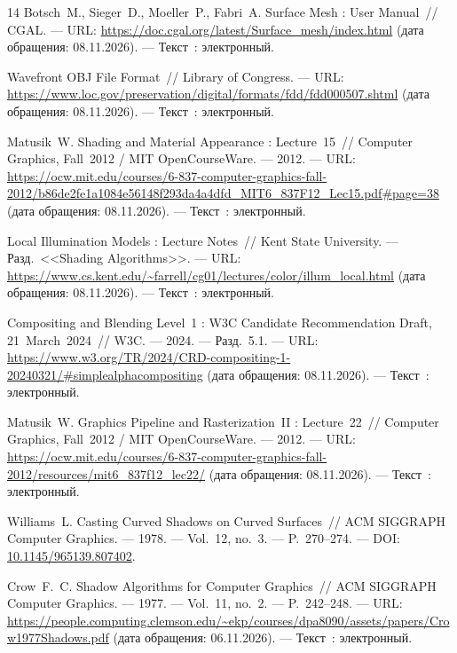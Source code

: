 \begin{thebibliography}{14}
Botsch~M., Sieger~D., Moeller~P., Fabri~A. Surface Mesh : User Manual~// CGAL. --- URL: \url{https://doc.cgal.org/latest/Surface_mesh/index.html} (дата обращения: 08.11.2026). --- Текст~: электронный.

Wavefront OBJ File Format~// Library of Congress. --- URL: \url{https://www.loc.gov/preservation/digital/formats/fdd/fdd000507.shtml} (дата обращения: 08.11.2026). --- Текст~: электронный.

Matusik~W. Shading and Material Appearance : Lecture~15~// Computer Graphics, Fall~2012 / MIT OpenCourseWare. --- 2012. --- URL: \url{https://ocw.mit.edu/courses/6-837-computer-graphics-fall-2012/b86de2fe1a1084e56148f293da4a4dfd_MIT6_837F12_Lec15.pdf#page=38} (дата обращения: 08.11.2026). --- Текст~: электронный.

Local Illumination Models : Lecture Notes~// Kent State University. --- Разд.~<<Shading Algorithms>>. --- URL: \url{https://www.cs.kent.edu/~farrell/cg01/lectures/color/illum_local.html} (дата обращения: 08.11.2026). --- Текст~: электронный.

Compositing and Blending Level~1 : W3C Candidate Recommendation Draft, 21~March~2024~// W3C. --- 2024. --- Разд.~5.1. --- URL: \url{https://www.w3.org/TR/2024/CRD-compositing-1-20240321/#simplealphacompositing} (дата обращения: 08.11.2026). --- Текст~: электронный.

Matusik~W. Graphics Pipeline and Rasterization~II : Lecture~22~// Computer Graphics, Fall~2012 / MIT OpenCourseWare. --- 2012. --- URL: \url{https://ocw.mit.edu/courses/6-837-computer-graphics-fall-2012/resources/mit6_837f12_lec22/} (дата обращения: 08.11.2026). --- Текст~: электронный.

Williams~L. Casting Curved Shadows on Curved Surfaces~// ACM SIGGRAPH Computer Graphics. --- 1978. --- Vol.~12, no.~3. --- P.~270--274. --- DOI: \href{https://doi.org/10.1145/965139.807402}{10.1145/965139.807402}.

Crow~F.~C. Shadow Algorithms for Computer Graphics~// ACM SIGGRAPH Computer Graphics. --- 1977. --- Vol.~11, no.~2. --- P.~242--248. --- URL: \url{https://people.computing.clemson.edu/~ekp/courses/dpa8090/assets/papers/Crow1977Shadows.pdf} (дата обращения: 06.11.2026). --- Текст~: электронный.

\end{thebibliography}
\endgroup

\newpage
